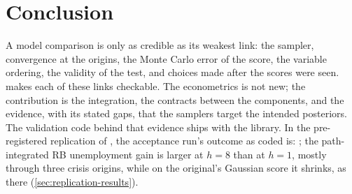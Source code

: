 \section{Conclusion}\label{sec:conclusion}

A model comparison is only as credible as its weakest link: the sampler, convergence at the
origins, the Monte Carlo error of the score, the variable ordering, the validity of the test, and
choices made after the scores were seen.  makes each of these links checkable. The
econometrics is not new; the contribution is the integration, the contracts between the components,
and the evidence, with its stated gaps, that the samplers target the intended posteriors. The validation code behind that evidence ships with the library. %
In the pre-registered replication of \citet{clark2015macroeconomic}, the acceptance run's outcome
as coded is: ; the path-integrated RB unemployment gain is larger at $h = 8$
than at $h = 1$, mostly through three crisis origins, while on the original's Gaussian score it
shrinks, as there (\cref{sec:replication-results}). %

